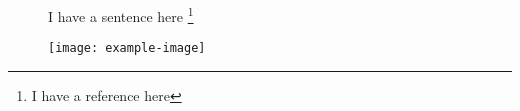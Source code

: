 \documentclass[11pt]{beamer}
\begin{document}
\begin{frame}
\begin{figure}
 I have a sentence here  \footnote{\tiny I have a reference here \vspace{1.5ex}} 

 \vspace*{1cm}
\texttt{[image: example-image]}
\end{figure}
\end{frame}
\end{document}
